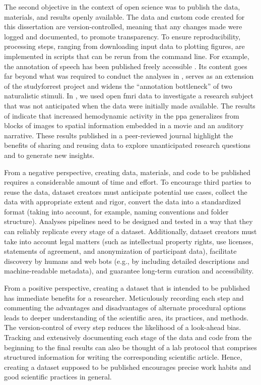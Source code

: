 %
The second objective in the context of open science was to publish the data,
materials, and results openly available.
%
The data and custom code created for this dissertation are version-controlled,
meaning that any changes made were logged and documented, to promote
transparency.
%
To ensure reproducibility, processing steps, ranging from downloading input data
to plotting figures, are implemented in scripts that can be rerun from the
command line.
%
For example, the annotation of speech has been published freely accessible
\citep{haeusler2021speechanno}.
%
Its content goes far beyond what was required to conduct the analyses in
\citet{haeusler2022processing}, serves as an extension of the studyforrest
project and widens the ``annotation bottleneck'' \citep[][p.
16]{aliko2020naturalistic} of two naturalistic stimuli.
%
In \citet{haeusler2022processing}, we used open \ac{fmri} data to investigate a
research subject that was not anticipated when the data were initially made
available.
%
The results of \citet{haeusler2022processing} indicate that increased
hemodynamic activity in the \ac{ppa} generalizes from blocks of images to
spatial information embedded in a movie and an auditory narrative.
%
These results published in a peer-reviewed journal highlight the benefits of
sharing and reusing data to explore unanticipated research questions and to
generate new insights.

From a negative perspective, creating data, materials, and code to be published
requires a considerable amount of time and effort.
%
To encourage third parties to reuse the data, dataset creators must anticipate
potential use cases, collect the data with appropriate extent and rigor, convert
the data into a standardized format (taking into account, for example, naming
conventions and folder structure).
Analyses pipelines need to be designed and tested in a way that they can
reliably replicate every stage of a dataset.
Additionally, dataset creators must take into account legal matters (such as
intellectual property rights, use licenses, statements of agreement, and
anonymization of participant data), facilitate discovery by humans and web bots
(e.g., by including detailed descriptions and machine-readable metadata), and
guarantee long-term curation and accessibility.

%
From a positive perspective, creating a dataset that is intended to be published
has immediate benefits for a researcher.
%
Meticulously recording each step and commenting the advantages and disadvantages
of alternate procedural options leads to deeper understanding of the scientific
area, its practices, and methods.
%
The version-control of every step reduces the likelihood of a look-ahead bias.
%
Tracking and extensively documenting each stage of the data and code from the
beginning to the final results can also be thought of a lab protocol that
comprises structured information for writing the corresponding scientific
article.
%
Hence, creating a dataset supposed to be published encourages precise work
habits and good scientific practices in general.


